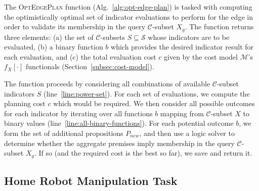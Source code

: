 The \textsc{OptEdgePlan} function (Alg.~\ref{alg:opt-edge-plan})
is tasked with computing
the optimistically optimal set of indicator evaluations to perform
for the edge in order to validate its membership in the query
$\mathcal{C}$-subset $X_g$.
The function returns three elements:
(a) the set of $\mathcal{C}$-subsets $S \subseteq \mathcal{S}$
whose indicators are to be evaluated,
(b) a binary function $b$
which provides the desired indicator result for each evaluation,
and (c) the total evaluation cost $c$
given by the cost model $\mathcal{M}$'s $f_X[\cdot]$ functionals
(Section~\ref{subsec:cost-model}).

The function proceeds by considering all combinations of
available $\mathcal{C}$-subset indicators $S$ (line~\ref{line:power-set}).
For each set of evaluations,
we compute the planning cost $c$ which would be required.
We then consider all possible outcomes for each indicator
by iterating over all functions $b$ mapping
from $\mathcal{C}$-subset $X$ to binary values
(line~\ref{line:all-binary-functions}).
For each potential outcome $b$,
we form the set of additional propositions $P_{new}$,
and then use a logic solver to determine whether the aggregate
premises imply membership in the query $\mathcal{C}$-subset $X_g$.
If so (and the required cost is the best so far),
we save and return it.

\subsection{Home Robot Manipulation Task}
\label{subsec:herb-experiment}

